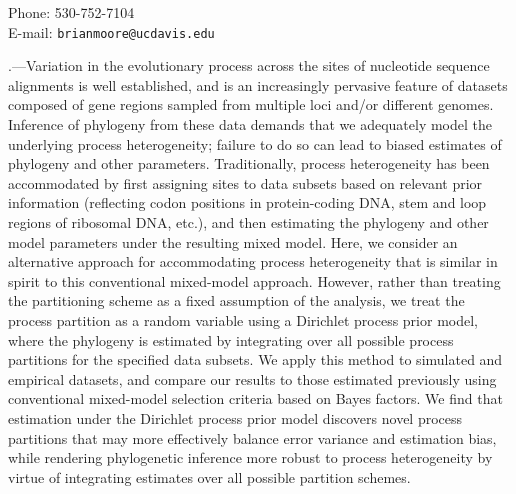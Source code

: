 \documentclass[11pt]{article}
\begin{document}
\begin{titlepage}
\begin{flushleft}
Phone: 530-752-7104 \\
\vspace{-0.4\baselineskip}
E-mail: {\tt brianmoore@ucdavis.edu} \\
\end{flushleft}

\end{titlepage}

\newpage


.---Variation in the evolutionary process across the sites of nucleotide 
sequence alignments is well established, and is an increasingly pervasive feature of datasets 
composed of gene regions sampled from multiple loci and/or different genomes.
Inference of phylogeny from these data demands that we adequately model the underlying process heterogeneity; failure to do so can lead to biased estimates of phylogeny and other parameters.
Traditionally, process heterogeneity has been accommodated by first assigning sites to data subsets based on relevant prior information (reflecting codon positions in protein-coding DNA, stem and loop 
regions of ribosomal DNA, etc.), and then estimating the phylogeny and other model parameters 
under the resulting mixed model.
Here, we consider an alternative approach for accommodating process heterogeneity that is similar in spirit to this conventional mixed-model approach.
However, rather than treating the partitioning scheme as a fixed assumption of the analysis, 
we treat the process partition as a random variable using a Dirichlet process prior model, where the phylogeny is estimated by integrating over all possible process partitions for the specified data subsets.
We apply this method to simulated and empirical datasets, and compare our results to those estimated previously using conventional mixed-model selection criteria based on Bayes factors.
We find that estimation under the Dirichlet process prior model discovers novel process partitions that may more effectively balance error variance and estimation bias, while rendering phylogenetic inference more robust to process heterogeneity by virtue of integrating estimates over all possible partition schemes.  

\medskip


\newpage
\end{document}
